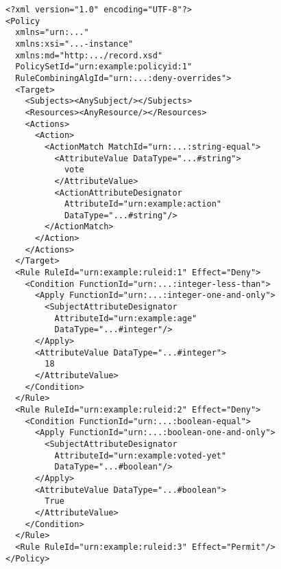 \begin{verbatim}
<?xml version="1.0" encoding="UTF-8"?>
<Policy
  xmlns="urn:..."
  xmlns:xsi="...-instance"
  xmlns:md="http:.../record.xsd"
  PolicySetId="urn:example:policyid:1"
  RuleCombiningAlgId="urn:...:deny-overrides">
  <Target>
    <Subjects><AnySubject/></Subjects>
    <Resources><AnyResource/></Resources>
    <Actions>
      <Action>
        <ActionMatch MatchId="urn:...:string-equal">
          <AttributeValue DataType="...#string">
            vote
          </AttributeValue>
          <ActionAttributeDesignator
            AttributeId="urn:example:action"
            DataType="...#string"/>
        </ActionMatch>
      </Action>
    </Actions>
  </Target>
  <Rule RuleId="urn:example:ruleid:1" Effect="Deny">
    <Condition FunctionId="urn:...:integer-less-than">
      <Apply FunctionId="urn:...:integer-one-and-only">
        <SubjectAttributeDesignator
          AttributeId="urn:example:age"
          DataType="...#integer"/>
      </Apply>
      <AttributeValue DataType="...#integer">
        18
      </AttributeValue>
    </Condition>
  </Rule>
  <Rule RuleId="urn:example:ruleid:2" Effect="Deny">
    <Condition FunctionId="urn:...:boolean-equal">
      <Apply FunctionId="urn:...:boolean-one-and-only">
        <SubjectAttributeDesignator
          AttributeId="urn:example:voted-yet"
          DataType="...#boolean"/>
      </Apply>
      <AttributeValue DataType="...#boolean">
        True
      </AttributeValue>
    </Condition>
  </Rule>
  <Rule RuleId="urn:example:ruleid:3" Effect="Permit"/>
</Policy>
\end{verbatim}
